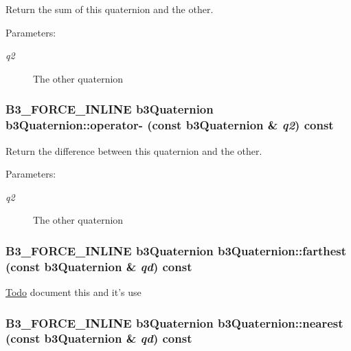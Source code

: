 Return the sum of this quaternion and the other. 

\begin{Desc}
\item[Parameters:]
\begin{description}
\item[{\em q2}]The other quaternion \end{description}
\end{Desc}
\hypertarget{classb3_quaternion_67a697c45563268c8ff6da91bb4d6fea}{
\subsubsection[operator-]{\setlength{\rightskip}{0pt plus 5cm}B3\_\-FORCE\_\-INLINE {\bf b3Quaternion} b3Quaternion::operator- (const {\bf b3Quaternion} \& {\em q2}) const}}
\label{classb3_quaternion_67a697c45563268c8ff6da91bb4d6fea}


Return the difference between this quaternion and the other. 

\begin{Desc}
\item[Parameters:]
\begin{description}
\item[{\em q2}]The other quaternion \end{description}
\end{Desc}
\hypertarget{classb3_quaternion_388e68921f4749a5641df37449076db0}{
\subsubsection[farthest]{\setlength{\rightskip}{0pt plus 5cm}B3\_\-FORCE\_\-INLINE {\bf b3Quaternion} b3Quaternion::farthest (const {\bf b3Quaternion} \& {\em qd}) const}}
\label{classb3_quaternion_388e68921f4749a5641df37449076db0}


\begin{Desc}
\item[\hyperlink{todo__todo000002}{Todo}]document this and it's use \end{Desc}
\hypertarget{classb3_quaternion_c257faeb2bf5a223870603face96f002}{
\subsubsection[nearest]{\setlength{\rightskip}{0pt plus 5cm}B3\_\-FORCE\_\-INLINE {\bf b3Quaternion} b3Quaternion::nearest (const {\bf b3Quaternion} \& {\em qd}) const}}
\label{classb3_quaternion_c257faeb2bf5a223870603face96f002}


